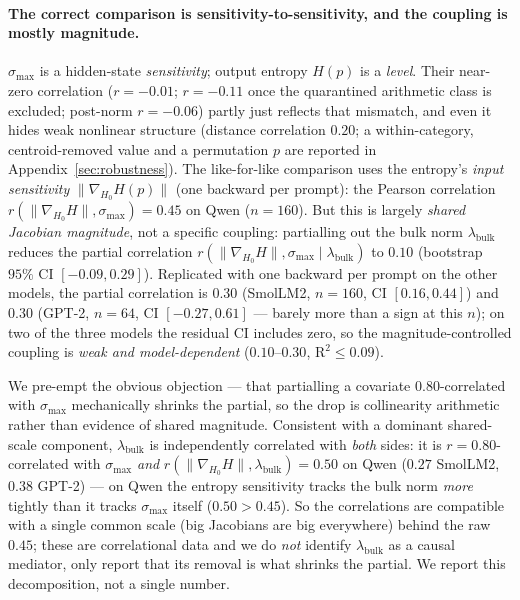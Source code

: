 \documentclass{article}
\begin{document}
\paragraph{The correct comparison is sensitivity-to-sensitivity, and the coupling is mostly magnitude.}
$\sigma_{\max}$ is a hidden-state \emph{sensitivity}; output entropy $H(p)$ is a \emph{level}. Their
near-zero correlation ($r=-0.01$; $r=-0.11$ once the quarantined arithmetic class is excluded;
post-norm $r=-0.06$) partly just reflects that mismatch, and even it hides weak nonlinear structure
(distance correlation $0.20$; a within-category, centroid-removed value and a permutation $p$ are
reported in Appendix~\ref{sec:robustness}). The like-for-like comparison uses the entropy's
\emph{input sensitivity} $\|\nabla_{H_0}H(p)\|$ (one backward per prompt): the Pearson correlation
$r(\|\nabla_{H_0}H\|,\sigma_{\max})=0.45$ on Qwen ($n=160$). But this is largely \emph{shared
Jacobian magnitude}, not a specific coupling: partialling out the bulk norm $\lambda_{\mathrm{bulk}}$
reduces the partial correlation
$r(\|\nabla_{H_0}H\|,\sigma_{\max}\mid\lambda_{\mathrm{bulk}})$ to $0.10$ (bootstrap $95\%$ CI
$[-0.09,0.29]$). Replicated with one backward per prompt on the other models, the partial correlation
is $0.30$ (SmolLM2, $n=160$, CI $[0.16,0.44]$) and $0.30$ (GPT-2, $n=64$, CI $[-0.27,0.61]$ --- barely
more than a sign at this $n$); on two of the three models the residual CI includes zero, so the
magnitude-controlled coupling is \emph{weak and model-dependent} ($0.10$--$0.30$, $\mathrm{R}^2\le0.09$).

We pre-empt the obvious objection --- that partialling a covariate $0.80$-correlated with
$\sigma_{\max}$ mechanically shrinks the partial, so the drop is collinearity arithmetic rather than
evidence of shared magnitude. Consistent with a dominant shared-scale component,
$\lambda_{\mathrm{bulk}}$ is independently correlated with \emph{both} sides: it is
$r=0.80$-correlated with $\sigma_{\max}$ \emph{and}
$r(\|\nabla_{H_0}H\|,\lambda_{\mathrm{bulk}})=0.50$ on Qwen ($0.27$ SmolLM2, $0.38$ GPT-2) --- on Qwen
the entropy sensitivity tracks the bulk norm \emph{more} tightly than it tracks $\sigma_{\max}$ itself
($0.50>0.45$). So the correlations are compatible with a single common scale (big Jacobians are big
everywhere) behind the raw $0.45$; these are correlational data and we do \emph{not} identify
$\lambda_{\mathrm{bulk}}$ as a causal mediator, only report that its removal is what shrinks the
partial. We report this decomposition, not a single number.
\end{document}
